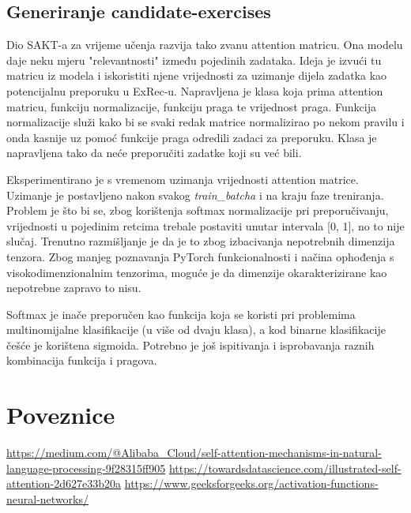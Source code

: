 		\subsection{Generiranje candidate-exercises}
		Dio SAKT-a za vrijeme učenja razvija tako zvanu attention matricu. Ona modelu daje neku mjeru "relevantnosti" između pojedinih zadataka. Ideja je izvući tu matricu iz modela i iskoristiti njene vrijednosti za uzimanje dijela zadatka kao potencijalnu preporuku u ExRec-u. Napravljena je klasa koja prima attention matricu, funkciju normalizacije, funkciju praga te vrijednost praga. Funkcija normalizacije služi kako bi se svaki redak matrice normalizirao po nekom pravilu i onda kasnije uz pomoć funkcije praga odredili zadaci za preporuku. Klasa je napravljena tako da neće preporučiti zadatke koji su već bili. 

		Eksperimentirano je s vremenom uzimanja vrijednosti attention matrice. Uzimanje je postavljeno nakon svakog \textit{train\_batcha} i na kraju faze treniranja. Problem je što bi se, zbog korištenja softmax normalizacije pri preporučivanju, vrijednosti u pojedinim retcima trebale postaviti unutar intervala [0, 1], no to nije slučaj. Trenutno razmišljanje je da je to zbog izbacivanja nepotrebnih dimenzija tenzora. Zbog manjeg poznavanja PyTorch funkcionalnosti i načina ophođenja s visokodimenzionalnim tenzorima, moguće je da dimenzije okarakterizirane kao nepotrebne zapravo to nisu.

		Softmax je inače preporučen kao funkcija koja se koristi pri problemima multinomijalne klasifikacije (u više od dvaju klasa), a kod binarne klasifikacije češće je korištena sigmoida. Potrebno je još ispitivanja i isprobavanja raznih kombinacija funkcija i pragova.
		
	\section{Poveznice}
\url{https://medium.com/@Alibaba_Cloud/self-attention-mechanisms-in-natural-language-processing-9f28315ff905}
\url{https://towardsdatascience.com/illustrated-self-attention-2d627e33b20a}
\url{https://www.geeksforgeeks.org/activation-functions-neural-networks/}
